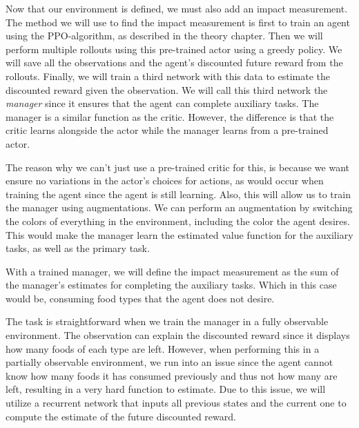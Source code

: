 \documentclass[12pt,A4]{report}
\theoremstyle{definition}
\begin{document}

Now that our environment is defined, we must also add an impact measurement. 
The method we will use to find the impact measurement is first to train an agent using the PPO-algorithm, as described in the theory chapter. Then we will perform multiple rollouts using this pre-trained actor using a greedy policy. We will save all the observations and the agent's discounted future reward from the rollouts. Finally, we will train a third network with this data to estimate the discounted reward given the observation. We will call this third network the \textit{manager} since it ensures that the agent can complete auxiliary tasks. The manager is a similar function as the critic. However, the difference is that the critic learns alongside the actor while the manager learns from a pre-trained actor. 

The reason why we can't just use a pre-trained critic for this, is because we want ensure no variations in the actor's choices for actions, as would occur when training the agent since the agent is still learning. Also, this will allow us to train the manager using augmentations. We can perform an augmentation by switching the colors of everything in the environment, including the color the agent desires. This would make the manager learn the estimated value function for the auxiliary tasks, as well as the primary task. 

With a trained manager, we will define the impact measurement as the sum of the manager's estimates for completing the auxiliary tasks. Which in this case would be, consuming food types that the agent does not desire. 

The task is straightforward when we train the manager in a fully observable environment. The observation can explain the discounted reward since it displays how many foods of each type are left. However, when performing this in a partially observable environment, we run into an issue since the agent cannot know how many foods it has consumed previously and thus not how many are left, resulting in a very hard function to estimate. Due to this issue, we will utilize a recurrent network that inputs all previous states and the current one to compute the estimate of the future discounted reward. 
\end{document}
